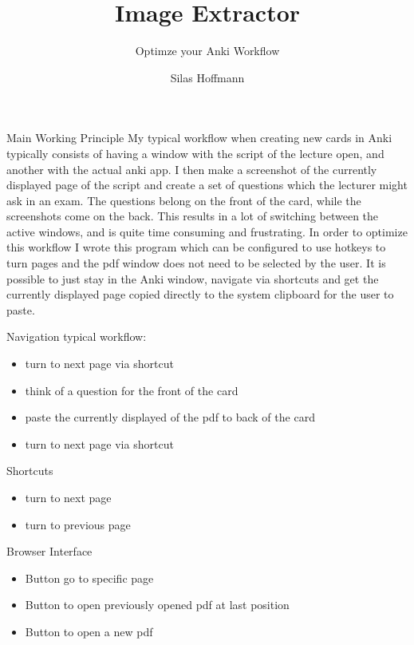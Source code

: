 \documentclass[pdf]{beamer}
\title{Image Extractor}
\subtitle{Optimze your Anki Workflow}
\author{
    Silas Hoffmann
}
\begin{document}
\maketitle

\begin{frame}{Main Working Principle}
    My typical workflow when creating new cards in Anki typically consists of having a window with the script of the lecture open, and another with the actual anki app. 
    I then make a screenshot of the currently displayed page of the script and create a set of questions which the lecturer might ask in an exam. The questions belong
    on the front of the card, while the screenshots come on the back. This results in a lot of switching between the active windows, and is quite time consuming and frustrating.
    In order to optimize this workflow I wrote this program which can be configured to use hotkeys to turn pages and the pdf window does not need to be selected by the user.
    It is possible to just stay in the Anki window, navigate via shortcuts and get the currently displayed page copied directly to the system clipboard for the user to paste.
\end{frame}


\begin{frame}{Navigation}
    typical workflow:
    \begin{itemize}
        \item turn to next page via shortcut
        \item think of a question for the front of the card
        \item paste the currently displayed of the pdf to back of the card
        \item turn to next page via shortcut
    \end{itemize}

    Shortcuts
    \begin{itemize}
        \item turn to next page
        \item turn to previous page
    \end{itemize}

    Browser Interface
    \begin{itemize}
        \item Button go to specific page
        \item Button to open previously opened pdf at last position
        \item Button to open a new pdf 
    \end{itemize}

\end{frame}
\end{document}
